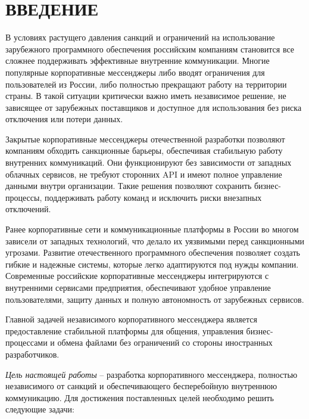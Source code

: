 \section*{ВВЕДЕНИЕ}

В условиях растущего давления санкций и ограничений на использование зарубежного программного обеспечения российским компаниям становится все сложнее поддерживать эффективные внутренние коммуникации. Многие популярные корпоративные мессенджеры либо вводят ограничения для пользователей из России, либо полностью прекращают работу на территории страны. В такой ситуации критически важно иметь независимое решение, не зависящее от зарубежных поставщиков и доступное для использования без риска отключения или потери данных.

Закрытые корпоративные мессенджеры отечественной разработки позволяют компаниям обходить санкционные барьеры, обеспечивая стабильную работу внутренних коммуникаций. Они функционируют без зависимости от западных облачных сервисов, не требуют сторонних API и имеют полное управление данными внутри организации. Такие решения позволяют сохранить бизнес-процессы, поддерживать работу команд и исключить риски внезапных отключений.

Ранее корпоративные сети и коммуникационные платформы в России во многом зависели от западных технологий, что делало их уязвимыми перед санкционными угрозами. Развитие отечественного программного обеспечения позволяет создать гибкие и надежные системы, которые легко адаптируются под нужды компании. Современные российские корпоративные мессенджеры интегрируются с внутренними сервисами предприятия, обеспечивают удобное управление пользователями, защиту данных и полную автономность от зарубежных сервисов.

Главной задачей независимого корпоративного мессенджера является предоставление стабильной платформы для общения, управления бизнес-процессами и обмена файлами без ограничений со стороны иностранных разработчиков.

\textit{Цель настоящей работы} – разработка корпоративного мессенджера, полностью независимого от санкций и обеспечивающего бесперебойную внутреннюю коммуникацию. Для достижения поставленных целей необходимо решить следующие задачи:


